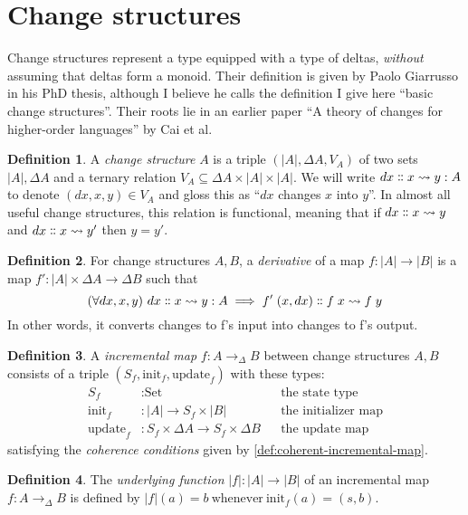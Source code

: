 \documentclass{article}
\theoremstyle{definition}
\newtheorem{definition}{Definition}
\theoremstyle{remark}
\newcommand\<\;                 %
\newcommand\quantifierspace{\ }
\newcommand\quantify[1]{({#1})\quantifierspace}
\newcommand\fa[1]{\quantify{\forall #1}}
\newcommand\ito{\to_\D}
\newcommand\changes[3]{{#1} \dblcolon {#2} \leadsto {#3}}
\newcommand\D\Delta
\newcommand\init{\text{init}}
\newcommand\update{\text{update}}
\newcommand\Set{\text{Set}}
\begin{document}

\section{Change structures}

Change structures represent a type equipped with a type of deltas, \emph{without} assuming that deltas form a monoid.
Their definition is given by Paolo Giarrusso in his PhD thesis, although I believe he calls the definition I give here ``basic change structures''.
Their roots lie in an earlier paper ``A theory of changes for higher-order languages'' by Cai et al.

\begin{definition}
  A \emph{change structure} $A$ is a triple $(|A|, \Delta A, V_A)$ of two sets $|A|, \Delta A$ and a ternary relation $V_A \subseteq \Delta A \times |A| \times |A|$.
  We will write $\changes{dx}{x}{y} : A$ to denote $(dx, x, y) \in V_A$ and gloss this as ``$dx$ changes $x$ into $y$''.
  In almost all useful change structures, this relation is functional, meaning that if $\changes{dx}{x}{y}$ and $\changes{dx}{x}{y'}$ then $y = y'$.
\end{definition}

\begin{definition}
  For change structures $A,B$, a \emph{derivative} of a map $f : |A| \to |B|$ is a map $f' : |A| \times \D A \to \D B$ such that
%
  \[
  \fa{dx,x,y} \changes{dx}{x}{y} : A \implies \changes{f'\<(x,dx)}{f\<x}{f\<y}
  \]
%
  In other words, it converts changes to f's input into changes to f's output.
\end{definition}

\begin{definition}
  A \emph{incremental map} $f : A \ito B$ between change structures $A,B$ consists of a triple $(S_f, \init_f, \update_f)$ with these types:
%
  \begin{align*}
    S_f &: \Set
    &&\text{the state type}
    \\
    \init_f &: |A| \to S_f \times |B|
    &&\text{the initializer map}
    \\
    \update_f &: S_f \times \D A \to S_f \times \D B
    &&\text{the update map}
  \end{align*}
%
  satisfying the \emph{coherence conditions} given by \cref{def:coherent-incremental-map}.
\end{definition}

\begin{definition}
  The \emph{underlying function} $|f| : |A| \to |B|$ of an incremental map $f : A \ito B$ is defined by $|f|(a) = b ~\text{whenever}~ \init_f(a) = (s,b)$.
\end{definition}
\end{document}
